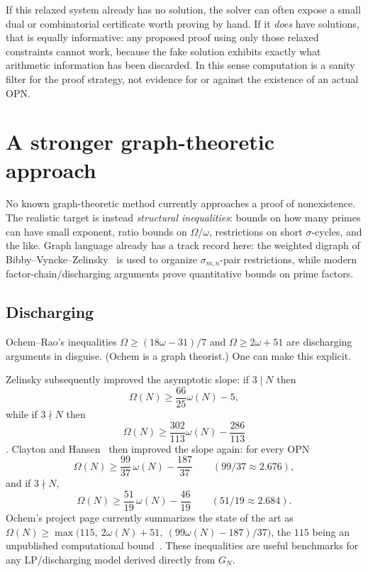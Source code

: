 \documentclass[11pt]{article}
\theoremstyle{definition}
\theoremstyle{remark}
\begin{document}
If this relaxed system already has no solution, the solver can often expose a
small dual or combinatorial certificate worth proving by hand.  If it
\emph{does} have solutions, that is equally informative: any proposed proof
using only those relaxed constraints cannot work, because the fake solution
exhibits exactly what arithmetic information has been discarded.  In this
sense computation is a sanity filter for the proof strategy, not evidence
for or against the existence of an actual OPN.

\section{A stronger graph-theoretic approach}\label{sec:approach}

No known graph-theoretic method currently approaches a proof of
nonexistence.  The realistic target is instead \emph{structural inequalities}:
bounds on how many primes can have small exponent, ratio bounds on
$\Omega/\omega$, restrictions on short $\sigma$-cycles, and the like.
Graph language already has a track record here: the weighted digraph of
Bibby--Vyncke--Zelinsky~\cite{BibbyVynckeZelinsky} is used to organize
$\sigma_{m,n}$-pair restrictions, while modern factor-chain/discharging
arguments prove quantitative bounds on prime factors.

\subsection{Discharging}

Ochem--Rao's inequalities $\Omega\ge(18\omega-31)/7$ and
$\Omega\ge2\omega+51$ \cite{OR2014} are discharging arguments in
disguise. (Ochem is a graph theorist.) One can make this explicit.

Zelinsky subsequently improved the asymptotic slope: if $3\mid N$ then
\[
\Omega(N)\ge \frac{66}{25}\omega(N)-5,
\]
while if $3\nmid N$ then
\[
\Omega(N)\ge \frac{302}{113}\omega(N)-\frac{286}{113}
\]
\cite{Zelinsky2021}.  Clayton and Hansen~\cite{ClaytonHansen} then improved
the slope again: for every OPN
\[
\Omega(N)\ge\frac{99}{37}\,\omega(N)-\frac{187}{37}
\qquad(99/37\approx2.676),
\]
and if $3\nmid N$,
\[
\Omega(N)\ge\frac{51}{19}\,\omega(N)-\frac{46}{19}
\qquad(51/19\approx2.684).
\]
Ochem's project page currently summarizes the state of the art as
$\Omega(N)\ge\max\bigl(115,\ 2\omega(N)+51,\ (99\omega(N)-187)/37\bigr)$,
the $115$ being an unpublished computational bound~\cite{OchemWeb}.  These
inequalities are useful benchmarks for any LP/discharging model derived
directly from $G_N$.
\end{document}
